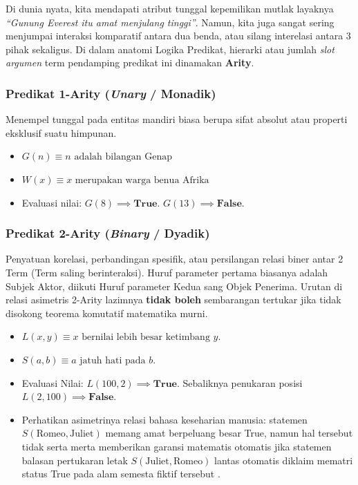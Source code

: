 Di dunia nyata, kita mendapati atribut tunggal kepemilikan mutlak layaknya \textit{``Gunung Everest itu amat menjulang tinggi''}. Namun, kita juga sangat sering menjumpai interaksi komparatif antara dua benda, atau silang interelasi antara 3 pihak sekaligus. Di dalam anatomi Logika Predikat, hierarki atau jumlah \textit{slot argumen} term pendamping predikat ini dinamakan \textbf{Arity}.

\subsubsection{Predikat 1-Arity (\textit{Unary} / Monadik)}
Menempel tunggal pada entitas mandiri biasa berupa sifat absolut atau properti eksklusif suatu himpunan.
\begin{itemize}
    \item $G(n) \equiv n \text{ adalah bilangan Genap}$
    \item $W(x) \equiv x \text{ merupakan warga benua Afrika}$
    \item Evaluasi nilai: $G(8) \implies \textbf{True}$. $G(13) \implies \textbf{False}$.
\end{itemize}

\subsubsection{Predikat 2-Arity (\textit{Binary} / Dyadik)}
Penyatuan korelasi, perbandingan spesifik, atau persilangan relasi biner antar 2 Term (Term saling berinteraksi). Huruf parameter pertama biasanya adalah Subjek Aktor, diikuti Huruf parameter Kedua sang Objek Penerima. Urutan di relasi asimetris 2-Arity lazimnya \textbf{tidak boleh} sembarangan tertukar jika tidak disokong teorema komutatif matematika murni.
\begin{itemize}
    \item $L(x, y) \equiv x \text{ bernilai lebih besar ketimbang } y$.
    \item $S(a, b) \equiv a \text{ jatuh hati pada } b$.
    \item Evaluasi Nilai: $L(100, 2) \implies \textbf{True}$. Sebaliknya penukaran posisi $L(2, 100) \implies \textbf{False}$. 
    \item Perhatikan asimetrinya relasi bahasa keseharian manusia: statemen $S(\text{Romeo}, \text{Juliet})$ memang amat berpeluang besar True, namun hal tersebut tidak serta merta memberikan garansi matematis otomatis jika statemen balasan pertukaran letak $S(\text{Juliet}, \text{Romeo})$ lantas otomatis diklaim mematri status True pada alam semesta fiktif tersebut \cite{wiki_first_order_logic}.
\end{itemize}

